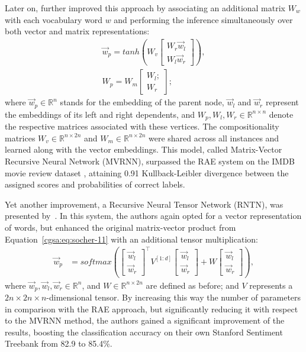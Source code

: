 Later on, \citet{Socher:12} further improved this approach by
associating an additional matrix $W_w$ with each vocabulary word $w$
and performing the inference simultaneously over both vector and
matrix representations:
\begin{align*}
  \vec{w}_p = tanh\left(W_v \begin{bmatrix}W_r\vec{w}_l\\
      W_l \vec{w}_r\end{bmatrix} \right),\\
  W_p = W_m \begin{bmatrix}W_l;\\
    W_r\end{bmatrix};
\end{align*}
where $\vec{w}_p\in\mathbb{R}^n$ stands for the embedding of the
parent node, $\vec{w}_l$ and $\vec{w}_r$ represent the embeddings of
its left and right dependents, and $W_p, W_l, W_r \in
\mathbb{R}^{n\times n}$ denote the respective matrices associated with
these vertices.  The compositionality matrices
$W_v\in\mathbb{R}^{n\times 2n}$ and $W_m\in\mathbb{R}^{n\times 2n}$
were shared across all instances and learned along with the vector
embeddings.  This model, called Matrix-Vector Recursive Neural Network
(MVRNN), surpassed the RAE system on the IMDB movie review dataset
\cite{Pang:05}, attaining 0.91 Kullback-Leibler divergence between the
assigned scores and probabilities of correct labels.

Yet another improvement, a Recursive Neural Tensor Network (RNTN), was
presented by~\citet{Socher:13}.  In this system, the authors again
opted for a vector representation of words, but enhanced the original
matrix-vector product from Equation~\ref{cgsa:eq:socher-11} with an
additional tensor multiplication:
\begin{align*}
  \vec{w}_p &= softmax\left(\begin{bmatrix}
  \vec{w}_l\\
  \vec{w}_r
  \end{bmatrix}^{\top}V^{[1:d]}\begin{bmatrix}
  \vec{w}_l\\
  \vec{w}_r
  \end{bmatrix}
            + W\begin{bmatrix}
  \vec{w}_l\\
  \vec{w}_r
\end{bmatrix}\right),\label{cgsa:eq:socher-13}
\end{align*}
where $\vec{w}_p, \vec{w}_l, \vec{w}_r\in\mathbb{R}^n$, and
$W\in\mathbb{R}^{n\times 2n}$ are defined as before; and $V$
represents a $2n\times 2n\times n$-dimensional tensor.  By increasing
this way the number of parameters in comparison with the RAE approach,
but significantly reducing it with respect to the MVRNN method, the
authors gained a significant improvement of the results, boosting the
classification accuracy on their own Stanford Sentiment Treebank from
82.9 to 85.4\%.

